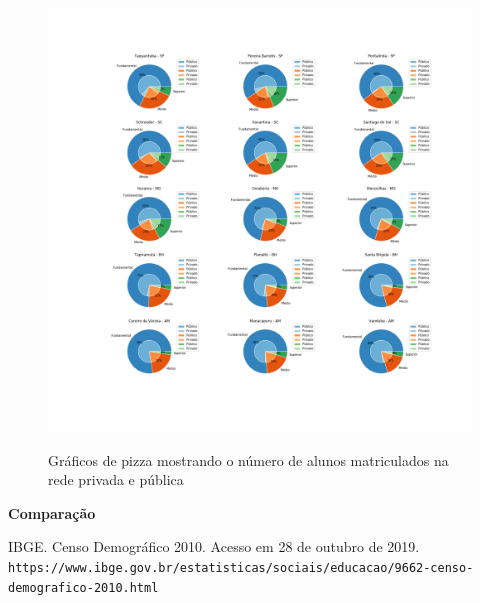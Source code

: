 \documentclass[12pt]{article}
\begin{document}
\setcounter{figure}{1}
\begin{figure}[H]
	\centering
	\includegraphics[width = 1\textwidth]{pie.png}
	\label{fig:A.2}
	\caption{Gráficos de pizza mostrando o número de alunos matriculados na rede privada e pública}
\end{figure}

\newpage
\textbf{\Large Comparação} \par


\newpage
\begin{thebibliography}{9}
	IBGE. Censo Demográfico 2010.
	Acesso em 28 de outubro de 2019. \\\texttt{https://www.ibge.gov.br/estatisticas/sociais/educacao/9662-censo-demografico-2010.html}
	
\end{thebibliography}
\end{document}
